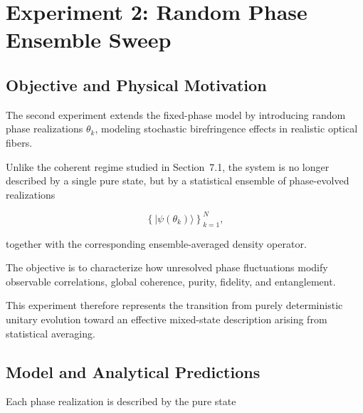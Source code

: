 
\newpage

\section{Experiment 2: Random Phase Ensemble Sweep}
\label{sec:exp_2_random_phase_ensemble_sweep}


\subsection*{Objective and Physical Motivation}

The second experiment extends the fixed-phase model by introducing random phase realizations \( \theta_k \), modeling stochastic birefringence effects in realistic optical fibers.

Unlike the coherent regime studied in Section~7.1, the system is no longer described by a single pure state, but by a statistical ensemble of phase-evolved realizations

\[
\left\{
|\psi(\theta_k)\rangle
\right\}_{k=1}^{N},
\]

together with the corresponding ensemble-averaged density operator.

The objective is to characterize how unresolved phase fluctuations modify observable correlations, global coherence, purity, fidelity, and entanglement.

This experiment therefore represents the transition from purely deterministic unitary evolution toward an effective mixed-state description arising from statistical averaging.


\subsection*{Model and Analytical Predictions}

Each phase realization is described by the pure state

